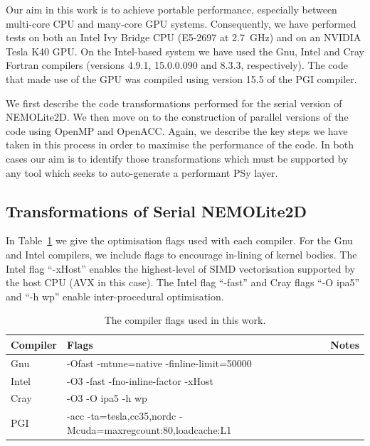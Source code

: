 \documentclass[journal]{IEEEtran}
\begin{document}
Our aim in this work is to achieve portable performance, especially
between multi-core CPU and many-core GPU systems. Consequently, we
have performed tests on both an Intel Ivy Bridge CPU (E5-2697 at
2.7~GHz) and on an NVIDIA Tesla K40 GPU.  On the Intel-based system we
have used the Gnu, Intel and Cray Fortran compilers (versions 4.9.1,
15.0.0.090 and 8.3.3, respectively). The code that made use of the GPU
was compiled using version 15.5 of the PGI compiler.

We first describe the code transformations performed for the serial
version of NEMOLite2D.  We then move on to the construction of
parallel versions of the code using OpenMP and OpenACC. Again, we
describe the key steps we have taken in this process in order to
maximise the performance of the code. In both cases our aim is to
identify those transformations which must be supported by any tool
which seeks to auto-generate a performant PSy layer.

\subsection{Transformations of Serial NEMOLite2D}

In Table~\ref{TABLE_compiler_flags} we give the optimisation flags
used with each compiler. For the Gnu and Intel compilers, we
include flags to encourage in-lining of kernel bodies. The Intel flag
``-xHost'' enables the highest-level of SIMD vectorisation supported
by the host CPU (AVX in this case). The Intel flag ``-fast'' and Cray
flags ``-O ipa5'' and ``-h wp'' enable inter-procedural optimisation.

\begin{table}[!t]
\renewcommand{\arraystretch}{1.3}
\caption{The compiler flags used in this work.}
\label{TABLE_compiler_flags}
\centering
\begin{tabular}{l|l|l}
\hline
Compiler  &  Flags                                    & Notes \\
\hline
Gnu       & -Ofast -mtune=native -finline-limit=50000 &   \\
Intel     & -O3 -fast -fno-inline-factor -xHost       &   \\
Cray      & -O3 -O ipa5 -h wp                         &   \\
PGI       & -acc -ta=tesla,cc35,nordc -Mcuda=maxregcount:80,loadcache:L1 & \\
\hline
\end{tabular}
\end{table}
\end{document}
